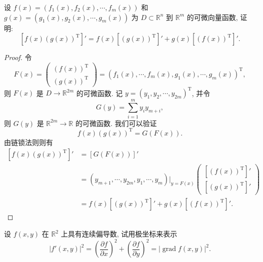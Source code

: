 \documentclass[UTF8,12pt,a4paper,fontset=fandol]{ctexart}
\begin{document}
\begin{example}\label{course-example-14-2-4}\quad 设 $f(x)=(f_1(x),f_2(x),\cdots,f_m(x))$ 和 $g(x)=(g_1(x),g_2(x),\cdots,g_m(x))$ 为 $D\subset\mathbb R^n$ 到 $\mathbb R^m$ 的可微向量函数, 证明:
\[
  [f(x)(g(x))^\mathrm T]'=f(x)[(g(x))^\mathrm T]'+g(x)[(f(x))^\mathrm T]'.
\]

\end{example}
\begin{proof}\quad 令
\[
  F(x)=
  \begin{pmatrix}
    (f(x))^\mathrm T\\
    (g(x))^\mathrm T
  \end{pmatrix}
  =(f_1(x),\cdots,f_m(x),g_1(x),\cdots,g_m(x))^\mathrm T,
\]
则 $F(x)$ 是 $D\to\mathbb R^{2m}$ 的可微函数. 记 $y=(y_1,y_2,\cdots,y_{2m})^\mathrm T$, 并令
\[
  G(y)=\sum_{i=1}^m y_i y_{m+i},
\]
则 $G(y)$ 是 $\mathbb R^{2m}\to\mathbb R$ 的可微函数. 我们可以验证
\[
  f(x)(g(x))^\mathrm T=G(F(x)).
\]
由链锁法则则有
\[
\begin{aligned}
  [f(x)(g(x))^\mathrm T]'
  &=[G(F(x))]'\\
  &=(y_{m+1},\cdots,y_{2m},y_1,\cdots,y_m)\big|_{y=F(x)}
  \begin{pmatrix}
    [(f(x))^\mathrm T]'\\
    [(g(x))^\mathrm T]'
  \end{pmatrix}\\
  &=f(x)[(g(x))^\mathrm T]'+g(x)[(f(x))^\mathrm T]'.
\end{aligned}
\]

\end{proof}
\begin{example}\label{course-example-14-2-5}\quad 设 $f(x,y)$ 在 $\mathbb R^2$ 上具有连续偏导数, 试用极坐标来表示
\[
  |f'(x,y)|^2=
  \left(\frac{\partial f}{\partial x}\right)^2+
  \left(\frac{\partial f}{\partial y}\right)^2
  =|\operatorname{grad}f(x,y)|^2.
\]

\end{example}
\end{document}
